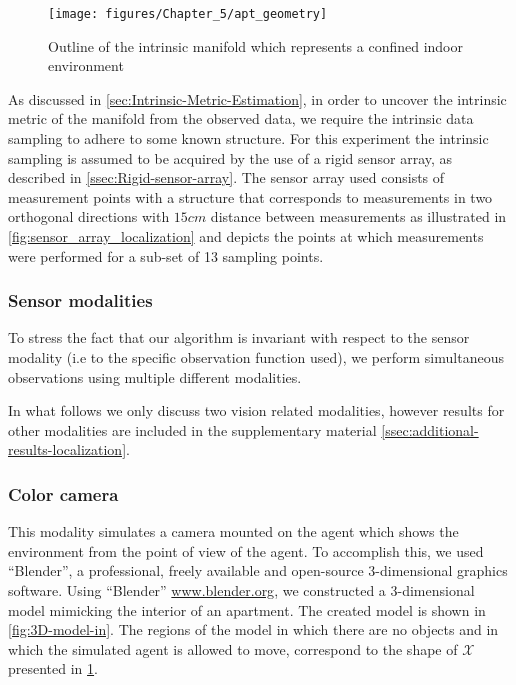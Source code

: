 	\begin{figure}[h]
		\begin{centering}
			\texttt{[image: figures/Chapter\_5/apt\_geometry]}
		\end{centering}
		\caption{Outline of the intrinsic manifold which represents a confined indoor environment \label{fig:Indoor-environment-shape}}
	\end{figure}
	
	As discussed in \cref{sec:Intrinsic-Metric-Estimation}, in order to uncover the intrinsic metric of the manifold from the observed data, we require the intrinsic data sampling to adhere to some known structure. For this experiment the intrinsic sampling is assumed to be acquired by the use of a rigid sensor array, as described in \cref{ssec:Rigid-sensor-array}. The sensor array used consists of measurement points with a structure that corresponds to measurements in two orthogonal directions with $15cm$ distance between measurements as illustrated in \cref{fig:sensor_array_localization} and depicts the points at which measurements were performed for a sub-set of 13 sampling points.
	

	\subsubsection{Sensor modalities}
	
	To stress the fact that our algorithm is invariant with respect to the sensor modality (i.e to the specific observation function used), we perform simultaneous observations using multiple
	different modalities. 
	
	In what follows we only discuss two vision related modalities, however results for other modalities are included in the supplementary material \cref{ssec:additional-results-localization}. 
	
	
	\subsubsection*{Color camera}
		\label{sssec:Color-camera}
	
	This modality simulates a camera mounted on the agent which shows the environment from the point of view of the agent. To accomplish this, we used ``Blender'', a professional, freely available and open-source 3-dimensional graphics software. Using ``Blender'' \url{www.blender.org}, we constructed a 3-dimensional model mimicking the interior of an apartment. The created model is shown in \cref{fig:3D-model-in}. The regions of the model in which there are no objects and in which the simulated agent is allowed to move, correspond to the shape of $\mathcal{X}$ presented in \cref{fig:Indoor-environment-shape}.


